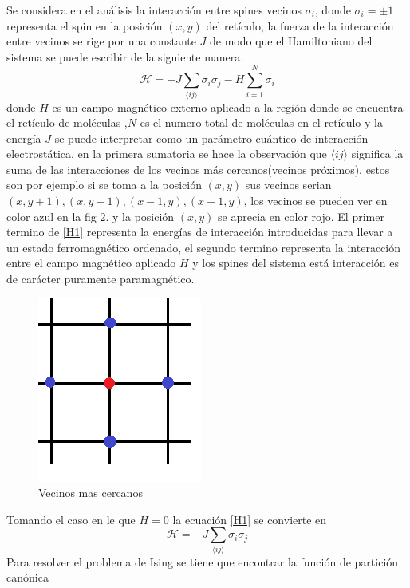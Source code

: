 \documentclass[a4paper]{article}
\begin{document}
Se considera en el análisis la interacción entre spines vecinos $\sigma_{i}$, donde $\sigma_i=\pm1$ representa el spin en la  posición $(x,y)$ del retículo, la fuerza de la interacción entre vecinos se rige por una constante $J$ de modo que el Hamiltoniano del sistema se puede escribir de la siguiente manera.
\begin{equation}
\label{H1}
\mathcal{H}=-J\sum_{\langle i j\rangle}\sigma_i \sigma_j-H\sum_{i=1}^{N}\sigma_i
\end{equation}
donde $H$ es un campo magnético externo aplicado a la región donde se encuentra el retículo de moléculas ,$N$ es el numero total de moléculas en el retículo y la energía $J$ se puede interpretar como un parámetro cuántico de interacción electrostática, en la primera sumatoria se hace la observación que $\langle i j\rangle$ significa la suma de las interacciones de los vecinos más cercanos(vecinos próximos), estos son por ejemplo si se toma a la posición $(x,y)$ sus vecinos serian ${(x,y+1),(x,y-1),(x-1,y),(x+1,y)}$, los vecinos se pueden ver en color azul en la fig 2. y la posición $(x,y)$ se aprecia en color rojo. El primer termino de \ref{H1} representa la energías de interacción introducidas para llevar a un estado ferromagnético ordenado, el segundo termino representa la interacción entre el campo magnético aplicado $H$ y los spines del sistema está interacción es de carácter puramente paramagnético.
\begin{figure}[H]
\begin{center}
\includegraphics[scale=0.4]{Neighbor.png} 
\end{center} 
\caption{Vecinos mas cercanos}
\end{figure}
Tomando el caso en le que $H=0$ la ecuación \ref{H1} se convierte en 
\begin{equation}
\label{H2}
\mathcal{H}=-J\sum_{\langle i j\rangle}\sigma_i \sigma_j
\end{equation}
Para resolver el problema de Ising se tiene que encontrar la función de partición canónica
\end{document}
